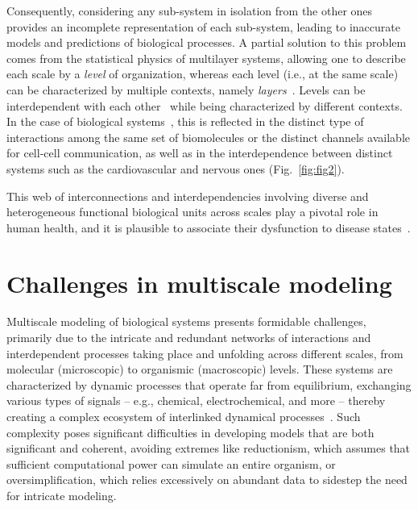 \documentclass[12pt]{article}
\renewcommand{\(}{\left(}
\renewcommand{\)}{\right)}
\renewcommand{\[}{\left[}
\renewcommand{\]}{\right]}
\begin{document}
Consequently, considering any sub-system in isolation from the other ones provides an incomplete representation of each sub-system, leading to inaccurate models and predictions of biological processes. A partial solution to this problem comes from the statistical physics of multilayer systems, allowing one to describe each scale by a \emph{level} of organization, whereas each level (i.e., at the same scale) can be characterized by multiple contexts, namely \emph{layers}~\cite{de2013mathematical,de2023more}. Levels can be interdependent with each other~\cite{buldyrev2010catastrophic,gao2012networks} while being characterized by different contexts. In the case of biological systems~\cite{de2018multilayer}, this is reflected in the distinct type of interactions among the same set of biomolecules or the distinct channels available for cell-cell communication, as well as in the interdependence between distinct systems such as the cardiovascular and nervous ones (Fig.~\ref{fig:fig2}). 

This web of interconnections and interdependencies involving diverse and heterogeneous functional biological units across scales play a pivotal role in human health, and it is plausible to associate their dysfunction to disease states~\cite{greene2017putting,halu2019multiplex}.

\section*{Challenges in multiscale modeling}

Multiscale modeling of biological systems presents formidable challenges, primarily due to the intricate and redundant networks of interactions and interdependent processes taking place and unfolding across different scales, from molecular (microscopic) to organismic (macroscopic) levels. These systems are characterized by dynamic processes that operate far from equilibrium, exchanging various types of signals -- e.g., chemical, electrochemical, and more -- thereby creating a complex ecosystem of interlinked dynamical processes~\cite{lopatkin2020predictive}. Such complexity poses significant difficulties in developing models that are both significant and coherent, avoiding extremes like reductionism, which assumes that sufficient computational power can simulate an entire organism, or oversimplification, which relies excessively on abundant data to sidestep the need for intricate modeling.
\end{document}
